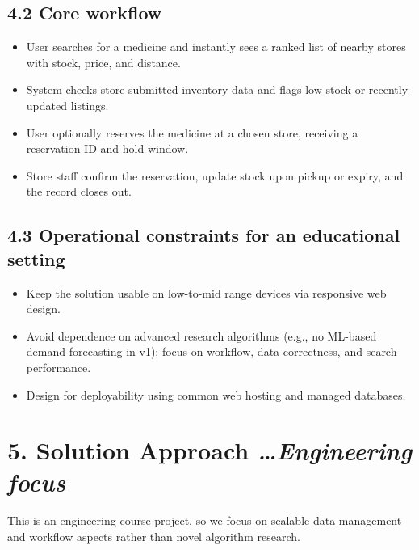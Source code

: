 \documentclass[
]{article}
\begin{document}
\subsection{\texorpdfstring{\textbf{4.2 Core
workflow}}{4.2 Core workflow}}\label{core-workflow}

\begin{itemize}
\item
  User searches for a medicine and instantly sees a ranked list of
  nearby stores with stock, price, and distance.
\item
  System checks store-submitted inventory data and flags low-stock or
  recently-updated listings.
\item
  User optionally reserves the medicine at a chosen store, receiving a
  reservation ID and hold window.
\item
  Store staff confirm the reservation, update stock upon pickup or
  expiry, and the record closes out.
\end{itemize}

\subsection{\texorpdfstring{\textbf{4.3 Operational constraints for an
educational
setting}}{4.3 Operational constraints for an educational setting}}\label{operational-constraints-for-an-educational-setting}

\begin{itemize}
\item
  Keep the solution usable on low-to-mid range devices via responsive
  web design.
\item
  Avoid dependence on advanced research algorithms (e.g., no ML-based
  demand forecasting in v1); focus on workflow, data correctness, and
  search performance.
\item
  Design for deployability using common web hosting and managed
  databases.
\end{itemize}

\section{\texorpdfstring{\textbf{5. Solution Approach}
\emph{\ldots Engineering
focus}}{5. Solution Approach \ldots Engineering focus}}\label{solution-approach-engineering-focus}

This is an engineering course project, so we focus on scalable
data-management and workflow aspects rather than novel algorithm
research.
\end{document}

